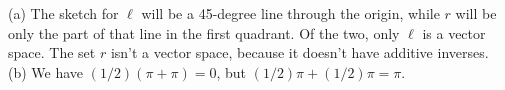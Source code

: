 (a) The sketch for $\ell$ will be a 45-degree line through the origin, while $r$ will
be only the part of that line in the first quadrant. Of the two, only $\ell$ is
a vector space. The set $r$ isn't a vector space, because it doesn't have additive
inverses.\\
(b) We have $(1/2)(\pi+\pi)=0$, but $(1/2)\pi+(1/2)\pi=\pi$.

